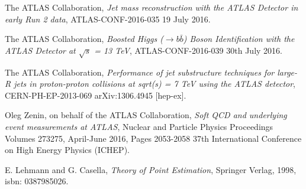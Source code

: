 \documentclass[UKenglish,texlive=2013]{\ATLASLATEXPATH atlasdoc}
\newcommand{\cme}{\ensuremath{\sqrt{s}}\xspace}
\begin{document}
\begin{thebibliography}{9}
The ATLAS Collaboration,
\emph{Jet mass reconstruction with the ATLAS Detector in early Run 2 data},
ATLAS-CONF-2016-035
19 July 2016.

The ATLAS Collaboration,
\emph{Boosted Higgs ($\to b\bar{b}$) Boson Identification with the ATLAS
Detector at $\cme$ = 13 TeV},
ATLAS-CONF-2016-039
30th July 2016.






The ATLAS Collaboration,
\emph{Performance of jet substructure techniques for large-R jets in proton-proton collisions at sqrt(s) = 7 TeV using the ATLAS detector},
CERN-PH-EP-2013-069
arXiv:1306.4945 [hep-ex].

Oleg Zenin, on behalf of the ATLAS Collaboration,
\emph{Soft QCD and underlying event measurements at ATLAS},
Nuclear and Particle Physics Proceedings
Volumes 273275, April-June 2016, Pages 2053-2058
37th International Conference on High Energy Physics (ICHEP).


E. Lehmann and G. Casella,
\emph{Theory of Point Estimation},
Springer Verlag, 1998,
isbn: 0387985026.


\end{thebibliography}
\end{document}
